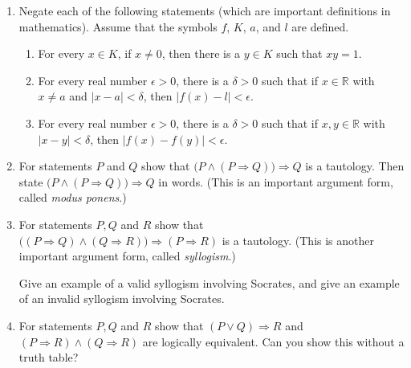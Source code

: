 \documentclass[12pt]{article}
\newcommand{\RR}{{\mathbb R}}  %
\newcommand{\demph}[1]{{\color{blue}\sl{#1}}}
\begin{document}
\begin{enumerate}
\newpage %
\item  Negate each of the following statements (which are important definitions in mathematics).
  Assume that the symbols $f$, $K$, $a$, and $l$ are defined.
  \begin{enumerate}

    \item  For every $x\in K$, if $x\neq 0$, then there is a $y\in K$ such that $xy=1$.
    \item  For every real number $\epsilon >0$, there is a $\delta>0$ such that if $x\in\RR$ with $x\neq a$ and $|x-a|<\delta$, then
      $|f(x)-l|<\epsilon$. 
    \item   For every real number $\epsilon >0$, there is a $\delta>0$ such that if $x,y\in\RR$ with $|x-y|<\delta$, then
      $|f(x)-f(y)|<\epsilon$. 
  \end{enumerate}



\item For statements $P$ and $Q$ show that
  $\bigl(P \land  (P\Rightarrow Q)\bigr) \Rightarrow Q$ is a tautology.
  Then state $\bigl(P \land  (P\Rightarrow Q)\bigr) \Rightarrow Q$ in words.
  (This is an important argument form, called \demph{modus ponens}.)


\item For statements $P, Q$ and $R$ show that
  $\bigl((P\Rightarrow Q) \land (Q\Rightarrow R)\bigr) \Rightarrow (P\Rightarrow R)$ is a tautology.
  (This is another important argument form, called \demph{syllogism}.)

  Give an example of a valid syllogism involving Socrates, and give an example of an invalid syllogism involving Socrates.


\item For statements $P, Q$ and $R$ show that
  $(P\lor Q) \Rightarrow R$ and $(P\Rightarrow R) \land (Q\Rightarrow R)$ are logically equivalent.
  Can you show this without a truth table? 



\end{enumerate}
\end{document}
